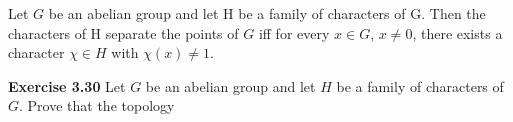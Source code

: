 \documentclass[12pt]{article}
\begin{document}
            Let $G$ be an abelian group and let H be a family of characters of G. Then the characters of H separate the
        points of $G$ iff for every $x \in G$, $x \neq 0$, there exists a character $\chi \in H$ with $\chi(x) \neq 1$.


    \textbf{Exercise 3.30} Let $G$ be an abelian group and let $H$ be a family of characters of $G$. Prove that the topology
\end{document}
